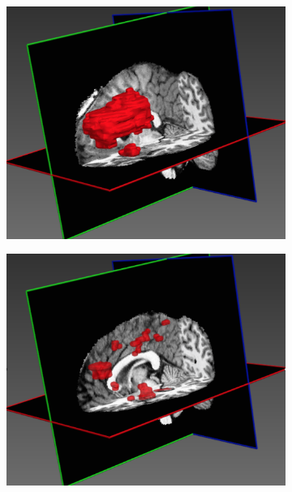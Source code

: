 \begin{figure}[h] 
\centering
\begin{subfigure}[b]{0.225\textwidth}
	\centering
	\includegraphics[clip=true, trim=10pt 0pt 10pt 0pt, width=1.\textwidth]{figures/introduction/3dLesionBig.png}
	\caption{}
	\label{fig:3dLesionBig}
\end{subfigure}
\begin{subfigure}[b]{0.225\textwidth}
	\centering
	\includegraphics[clip=true, trim=10pt 0pt 10pt 0pt, width=1.\textwidth]{figures/introduction/3dLesionsSmalls.png}

\end{subfigure}
\end{figure}
